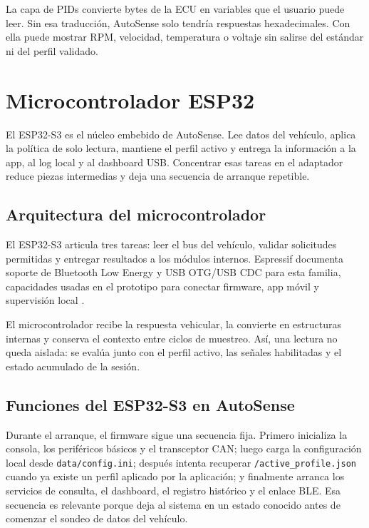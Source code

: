 \documentclass[12pt,letterpaper]{report}
\begin{document}
La capa de PIDs convierte bytes de la ECU en variables que el usuario puede leer. Sin esa traducción, AutoSense solo tendría respuestas hexadecimales. Con ella puede mostrar RPM, velocidad, temperatura o voltaje sin salirse del estándar ni del perfil validado.

\section{Microcontrolador ESP32}
\label{sec:microcontrolador-esp32}

El ESP32-S3 es el núcleo embebido de AutoSense. Lee datos del vehículo, aplica la política de solo lectura, mantiene el perfil activo y entrega la información a la app, al log local y al dashboard USB. Concentrar esas tareas en el adaptador reduce piezas intermedias y deja una secuencia de arranque repetible.

\subsection{Arquitectura del microcontrolador}

El ESP32-S3 articula tres tareas: leer el bus del vehículo, validar solicitudes permitidas y entregar resultados a los módulos internos. Espressif documenta soporte de Bluetooth Low Energy y USB OTG/USB CDC para esta familia, capacidades usadas en el prototipo para conectar firmware, app móvil y supervisión local \cite{espressif2026_esp32s3_get_started,espressif2026_esp32s3_usb_otg_console}.

El microcontrolador recibe la respuesta vehicular, la convierte en estructuras internas y conserva el contexto entre ciclos de muestreo. Así, una lectura no queda aislada: se evalúa junto con el perfil activo, las señales habilitadas y el estado acumulado de la sesión.

\subsection{Funciones del ESP32-S3 en AutoSense}

Durante el arranque, el firmware sigue una secuencia fija. Primero inicializa la consola, los periféricos básicos y el transceptor CAN; luego carga la configuración local desde \texttt{data/config.ini}; después intenta recuperar \texttt{/active\_profile.json} cuando ya existe un perfil aplicado por la aplicación; y finalmente arranca los servicios de consulta, el dashboard, el registro histórico y el enlace BLE. Esa secuencia es relevante porque deja al sistema en un estado conocido antes de comenzar el sondeo de datos del vehículo.
\end{document}
